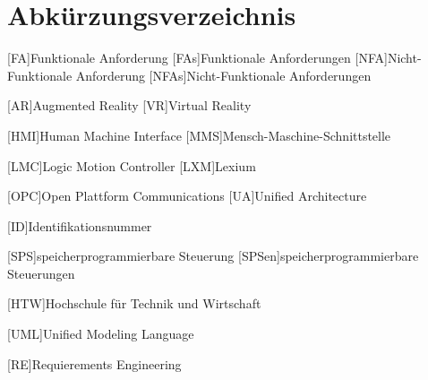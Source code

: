 \documentclass[12pt, a4paper, twoside]{article} %
\begin{document}

\clearpage

\listoffigures
\clearpage

\listoftables
\clearpage

\section*{Abkürzungsverzeichnis}
\begin{acronym}[FA]
	[FA]{Funktionale Anforderung}
	[FAs]{Funktionale Anforderungen}
	[NFA]{Nicht-Funktionale Anforderung}
	[NFAs]{Nicht-Funktionale Anforderungen}
\end{acronym}
\begin{acronym}[VR]
	[AR]{Augmented Reality}
	[VR]{Virtual Reality}
\end{acronym}
\begin{acronym}[HMI]
	[HMI]{Human Machine Interface}
	[MMS]{Mensch-Maschine-Schnittstelle}
\end{acronym}
\begin{acronym}[LMC]
	[LMC]{Logic Motion Controller}
	[LXM]{Lexium}
\end{acronym}
\begin{acronym}[OPC]
	[OPC]{Open Plattform Communications}
	[UA]{Unified Architecture}
\end{acronym}
\begin{acronym}[ID]
	[ID]{Identifikationsnummer}
\end{acronym}
\begin{acronym}[SPS]
	[SPS]{speicherprogrammierbare Steuerung}
	[SPSen]{speicherprogrammierbare Steuerungen}
\end{acronym}
\begin{acronym}[HTW]
	[HTW]{Hochschule für Technik und Wirtschaft}
\end{acronym}
\begin{acronym}[UML]
	[UML]{Unified Modeling Language}
\end{acronym}
\begin{acronym}[RE]
	[RE]{Requierements Engineering}
\end{acronym}
\end{document}
